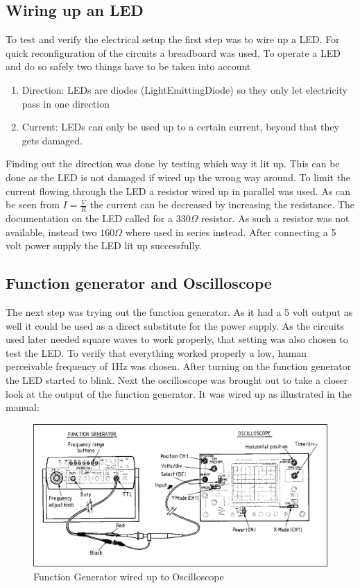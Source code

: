 \documentclass[fleqn,14pt]{article}
\begin{document}
\subsection{Wiring up an LED}
To test and verify the electrical setup the first step was to wire up a LED. For quick reconfiguration of
the circuits a breadboard was used. To operate a LED and do so safely two things have to be taken into account
\begin{enumerate}
\item Direction: LEDs are diodes (LightEmittingDiode) so they only let electricity pass in one direction
\item Current: LEDs can only be used up to a certain current, beyond that they gets damaged.
\end{enumerate}
Finding out the direction was done by testing which way it lit up. This can be done as the LED is not
damaged
if wired up the wrong way around. To limit the current flowing through the LED a resistor wired up in
parallel was used. As can be seen from $I = \frac{V}{R}$ the current can be decreased by increasing the
resistance. The documentation on the LED called for a $330\Omega$ resistor. As such a resistor was not
available, instead two $160\Omega$ where used in series instead. After connecting a 5 volt power supply
the LED lit up successfully.

\subsection {Function generator and Oscilloscope}
The next step was trying out the function generator. As it had a 5 volt output as well it could be used as
a direct substitute for the power supply. As the circuits used later needed square waves to work properly,
that setting was also chosen to test the LED. To verify that everything worked properly a low, human
perceivable frequency of 1Hz was chosen. After turning on the function generator the LED started
to blink.
\newline
\newline
Next the oscilloscope was brought out to take a closer look at the output of the function generator. It
was wired up as illustrated in the manual:
\begin{figure}[h]
\includegraphics[width=16cm]{images/Oscilloscope.png}
\caption{Function Generator wired up to Oscilloscope}
\label{fig:figure1}
\end{figure}
\end{document}
